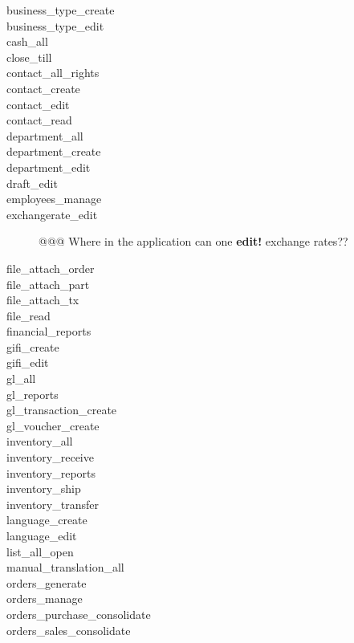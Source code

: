 \begin{description}
\item [business\_type\_create]
\item [business\_type\_edit]
\item [cash\_all]
\item [close\_till]
\item [contact\_all\_rights]
\item [contact\_create]
\item [contact\_edit]
\item [contact\_read]
\item [department\_all]
\item [department\_create]
\item [department\_edit]
\item [draft\_edit]
\item [employees\_manage]
\item [exchangerate\_edit] @@@ Where in the application can one \textbf{edit!} exchange rates?? %
\item [file\_attach\_order]
\item [file\_attach\_part]
\item [file\_attach\_tx]
\item [file\_read]
\item [financial\_reports]
\item [gifi\_create]
\item [gifi\_edit]
\item [gl\_all]
\item [gl\_reports]
\item [gl\_transaction\_create]
\item [gl\_voucher\_create]
\item [inventory\_all]
\item [inventory\_receive]
\item [inventory\_reports]
\item [inventory\_ship]
\item [inventory\_transfer]
\item [language\_create]
\item [language\_edit]
\item [list\_all\_open]
\item [manual\_translation\_all]
\item [orders\_generate]
\item [orders\_manage]
\item [orders\_purchase\_consolidate]
\item [orders\_sales\_consolidate]

\end{description}
